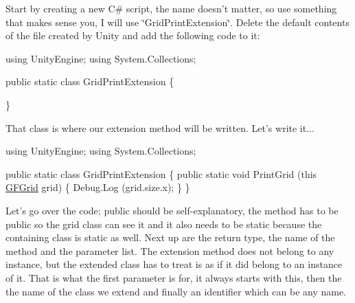 Start by creating a new C\# script, the name doesn't matter, so use something that makes sense you, I will use \char`\"{}\+Grid\+Print\+Extension\char`\"{}. Delete the default contents of the file created by Unity and add the following code to it\+: 
\begin{DoxyCode}
\textcolor{keyword}{using} UnityEngine;
\textcolor{keyword}{using} System.Collections;

\textcolor{keyword}{public} \textcolor{keyword}{static} \textcolor{keyword}{class }GridPrintExtension \{

\}
\end{DoxyCode}
 That class is where our extension method will be written. Let's write it... 
\begin{DoxyCode}
\textcolor{keyword}{using} UnityEngine;
\textcolor{keyword}{using} System.Collections;

\textcolor{keyword}{public} \textcolor{keyword}{static} \textcolor{keyword}{class }GridPrintExtension \{
    \textcolor{keyword}{public} \textcolor{keyword}{static} \textcolor{keywordtype}{void} PrintGrid (\textcolor{keyword}{this} \hyperlink{class_g_f_grid}{GFGrid} grid) \{
        Debug.Log (grid.size.x);
    \}
\}
\end{DoxyCode}
 Let's go over the code; {\ttfamily public} should be self-\/explanatory, the method has to be public so the grid class can see it and it also needs to be static because the containing class is static as well. Next up are the return type, the name of the method and the parameter list. The extension method does not belong to any instance, but the extended class has to treat is as if it did belong to an instance of it. That is what the first parameter is for, it always starts with {\ttfamily this}, then the the name of the class we extend and finally an identifier which can be any name.

